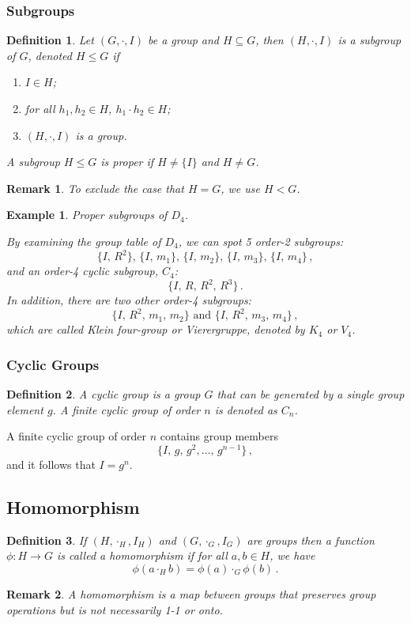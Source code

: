 \documentclass{article}
\theoremstyle{plain}\theoremheaderfont{\normalfont\itshape}\theorembodyfont{\rmfamily}\theoremseparator{.}\newtheorem*{rem}{Remark}\newtheorem*{ex}{Example}\newtheorem*{proof}{Proof}\newtheorem*{altp}{Alternative proof}
\theoremstyle{plain}\theoremheaderfont{\normalfont\bfseries}\theorembodyfont{\rmfamily}\theoremseparator{.}\newtheorem{thm}{Theorem}[section]\newtheorem{lem}[thm]{Lemma}\newtheorem{prop}[thm]{Proposition}\newtheorem*{cor}{Corollary}\newtheorem{defn}[thm]{Definition}\newtheorem{clm}[thm]{Claim}\newtheorem{clminproof}{Claim}
\theoremstyle{break}\theoremheaderfont{\normalfont\itshape}\theorembodyfont{\rmfamily}\theoremseparator{.\medskip}\newtheorem*{proofskip}{Proof}\newtheorem*{exs}{Examples}\newtheorem*{rems}{Remarks}
\theoremstyle{break}\theoremheaderfont{\normalfont\bfseries}\theorembodyfont{\rmfamily}\theoremseparator{.\medskip}\newtheorem{lemskip}[thm]{Lemma}\newtheorem{defnskip}[thm]{Definition}\newtheorem{propskip}[thm]{Proposition}\newtheorem{thmskip}[thm]{Theorem}
\numberwithin{equation}{section}
\begin{document}
	\subsubsection{Subgroups}
	\begin{defn}
		Let \((G,\cdot,I)\) be a group and \(H\subseteq G\), then \((H,\cdot,I)\) is a \textit{subgroup} of \(G\), denoted \(H\le G\) if
		\begin{enumerate}[topsep=0pt]
			\item \(I\in H\);
			\item for all \(h_1,h_2\in H\), \(h_1\cdot h_2\in H\);
			\item \((H,\cdot,I)\) is a group.
		\end{enumerate}
		A subgroup \(H\le G\) is \textit{proper} if \(H\ne\{I\}\) and \(H\ne G\). 
	\end{defn}
	\begin{rem}
		To exclude the case that \(H=G\), we use \(H<G\).
	\end{rem}
	\begin{ex}
		\textit{Proper subgroups of \(D_4\).}
		
		By examining the group table of \(D_4\), we can spot 5 order-2 subgroups:
		\[\{I,\, R^2\},\, \{I,\, m_1\},\, \{I,\, m_2\},\, \{I,\, m_3\},\, \{I,\, m_4\}\,, \]
		and an order-4 cyclic subgroup, \(C_4\):
		\[\{I,\, R,\, R^2,\, R^3\}\,.\]
		In addition, there are two other order-4 subgroups:
		\[\{I,\, R^2,\, m_1,\, m_2\}\text{ and } \{I,\, R^2,\, m_3,\, m_4\}\,,\]
		which are called \textit{Klein four-group} or \textit{Vierergruppe}, denoted by \(K_4\) or \(V_4\).
	\end{ex}
	\subsubsection{Cyclic Groups}
	\begin{defn}
		A \textit{cyclic group} is a group \(G\) that can be generated by a single group element \(g\). A finite cyclic group of order \(n\) is denoted as \(C_n\).
	\end{defn}
	A finite cyclic group of order \(n\) contains group members
	\[\{I,\, g,\, g^2,\dots,\, g^{n-1}\}\,,\]
	and it follows that \(I=g^n\).
	\subsection{Homomorphism}
	\begin{defn}
		If \((H,\cdot_H,I_H)\) and \((G,\cdot_G,I_G)\) are groups then a function \(\phi : H \to G\) is called a \textit{homomorphism} if for all \(a,b\in H\), we have
		\[\phi(a\cdot_H b)=\phi(a)\cdot_G\phi(b)\,.\]
	\end{defn}
	\begin{rem}
		A homomorphism is a map between groups that preserves group operations but is not necessarily 1-1 or onto.
	\end{rem}
\end{document}
